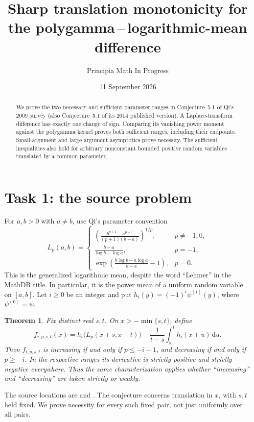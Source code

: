 \documentclass[11pt]{article}
\title{Sharp translation monotonicity for the polygamma\texorpdfstring{\,--\,}{--}logarithmic-mean difference}
\author{Principia Math In Progress}
\date{11 September 2026}
\newtheorem{theorem}{Theorem}
\newcommand{\dd}{\,\mathrm d}
\begin{document}
\maketitle

\begin{abstract}
We prove the two necessary and sufficient parameter ranges in
Conjecture~5.1 of Qi's 2009 survey (also Conjecture~5.1 of its 2014
published version). A Laplace-transform difference has exactly one
change of sign. Comparing its vanishing power moment against the
polygamma kernel proves both sufficient ranges, including their
endpoints. Small-argument and large-argument asymptotics prove necessity.
The sufficient inequalities also hold for arbitrary nonconstant bounded
positive random variables translated by a common parameter.
\end{abstract}

\section*{Task 1: the source problem}
For $a,b>0$ with $a\ne b$, use Qi's parameter convention
\[
L_p(a,b)=
\begin{cases}
\displaystyle\left(\frac{b^{p+1}-a^{p+1}}{(p+1)(b-a)}\right)^{1/p},
 &p\ne-1,0,\\[1ex]
\displaystyle\frac{b-a}{\log b-\log a},&p=-1,\\[1ex]
\displaystyle\exp\left(\frac{b\log b-a\log a}{b-a}-1\right),&p=0.
\end{cases}
\]
This is the generalized logarithmic mean, despite the word ``Lehmer''
in the MathDB title. In particular, it is the power mean of a uniform
random variable on $[a,b]$. Let $i\ge0$ be an integer and put
$h_i(y)=(-1)^i\psi^{(i)}(y)$, where $\psi^{(0)}=\psi$.

\begin{theorem}\label{thm:main}
Fix distinct real $s,t$. On $x>-\min\{s,t\}$, define
\[
f_{i,p,s,t}(x)=h_i\bigl(L_p(x+s,x+t)\bigr)
 -\frac1{t-s}\int_s^t h_i(x+u)\dd u.
\]
Then $f_{i,p,s,t}$ is increasing if and only if $p\le-i-1$,
and decreasing if and only if $p\ge-i$.
In the respective ranges its derivative is strictly positive and
strictly negative everywhere. Thus the same characterization applies
whether ``increasing'' and ``decreasing'' are taken strictly or weakly.
\end{theorem}

The source locations are \cite[Conjecture 5.1, p.~16]{qi2009} and
\cite[Conjecture 5.1, p.~162]{qi2014}. The conjecture concerns translation
in $x$, with $s,t$ held fixed. We prove necessity for every such fixed
pair, not just uniformly over all pairs.
\end{document}
